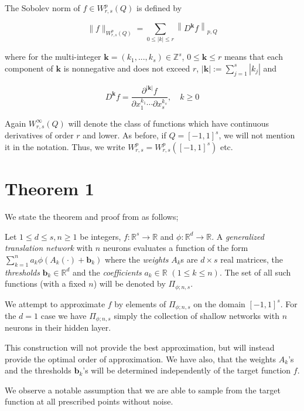 \documentclass[11pt,a4paper]{article}
\theoremstyle{plain}
\theoremstyle{definition}
\theoremstyle{remark}
\begin{document}
The Sobolev norm of \(f \in W^p_{r,s}(Q)\) is defined by 

\[
\|f\|_{W^p_{r,s}(Q)} = \sum_{0\leq |k| \leq r}  \left\lVert D^{\mathbf{k}} f\right\rVert_{p,Q}   
\]

where for the multi-integer \( \mathbf{k}  = (k_1,...,k_s) \in \mathbb{Z}^s \), \( 0 \leq \mathbf{k}  \leq r \) means that each component of \( \mathbf{k}  \) is nonnegative and does not exceed \( r \), \( |\mathbf{k} | := \sum_{j=1}^{s} |k_j| \) and 

\[
    D^{\mathbf{k} }f = \frac{\partial^{|\mathbf{k} |} f}{\partial x_1^{k_1} \cdots \partial x_s^{k_s}}, \quad k \geq 0
\]

Again \(W^{\infty }_{r,s}(Q)\) will denote the class of functions which have continuous derivatives of order \(r\) and lower. As before, if \(Q = [-1, 1]^s\), we will not mention it in the notation. Thus, we write \(W^p_{r,s} = W^p_{r,s}([-1, 1]^s)\) etc.

\section{Theorem 1}

We state the theorem and proof from \cite{Mhaskar} as follows;

Let $1 \leq d \leq s, n \geq 1$ be integers, $f : \mathbb{R}^s \rightarrow \mathbb{R}$ and $\phi : \mathbb{R}^d \rightarrow \mathbb{R}$. A \textit{generalized translation network} with $n$ neurons evaluates a function of the form $\sum_{k=1}^n a_k \phi(A_k (\cdot) + \mathbf{b}_k)$ where the \textit{weights} $A_k$s are $d \times s$ real matrices, the \textit{thresholds} $\mathbf{b}_k \in \mathbb{R}^d$ and the \textit{coefficients} $a_k \in \mathbb{R}$ $(1 \leq k \leq n)$. The set of all such functions (with a fixed $n$) will be denoted by $\Pi_{\phi;n,s}$.

We attempt to approximate \(f\) by elements of \(\Pi_{\phi;n,s}\) on the domain \([-1,1]^s\). For the \(d=1\) case we have \(\Pi_{\phi;n,s} \) simply the collection of shallow networks with \(n\) neurons in their hidden layer.

This construction will not provide the best approximation, but will instead provide the optimal order of approximation. We have also, that the weights \(A_{k}\)'s and the thresholds \(\mathbf{b}_{k}\)'s  will be determined independently of the target function
\(f\).

We observe a notable assumption that we are able to sample from the
target function at all prescribed points without noise.
\end{document}

